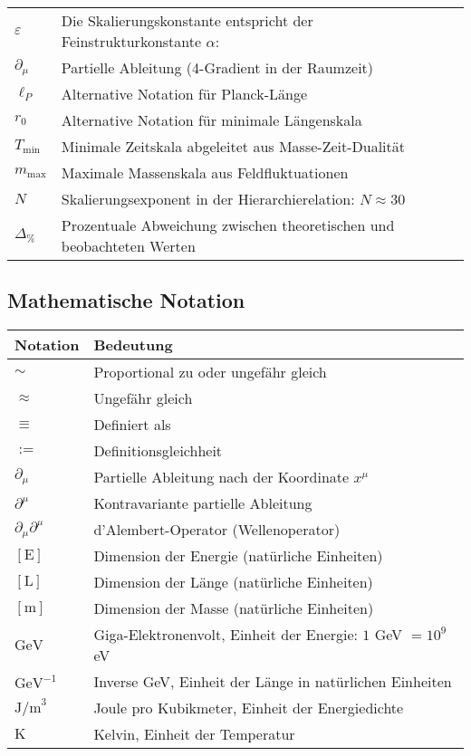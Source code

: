\documentclass[12pt,a4paper]{article}
\numberwithin{equation}{section}
\begin{document}
\begin{longtable}{p{2cm} p{12cm}}
		$\varepsilon$ & Die Skalierungskonstante entspricht der Feinstrukturkonstante $\alpha$: \\
		$\partial_\mu$ & Partielle Ableitung (4-Gradient in der Raumzeit) \\
		$\ell_P$ & Alternative Notation für Planck-Länge \\
		$r_0$ & Alternative Notation für minimale Längenskala \\
		$T_{\text{min}}$ & Minimale Zeitskala abgeleitet aus Masse-Zeit-Dualität \\
		$m_{\text{max}}$ & Maximale Massenskala aus Feldfluktuationen \\
		$N$ & Skalierungsexponent in der Hierarchierelation: $N \approx 30$ \\
		$\Delta_{\%}$ & Prozentuale Abweichung zwischen theoretischen und beobachteten Werten \\
		\bottomrule
	\end{longtable}
	
	\subsection*{Mathematische Notation}
	
	\begin{longtable}{p{2cm} p{12cm}}
		\toprule
		\textbf{Notation} & \textbf{Bedeutung} \\
		\midrule
		\endhead
		
		$\sim$ & Proportional zu oder ungefähr gleich \\
		$\approx$ & Ungefähr gleich \\
		$\equiv$ & Definiert als \\
		$:=$ & Definitionsgleichheit \\
		$\partial_\mu$ & Partielle Ableitung nach der Koordinate $x^\mu$ \\
		$\partial^\mu$ & Kontravariante partielle Ableitung \\
		$\partial_\mu \partial^\mu$ & d'Alembert-Operator (Wellenoperator) \\
		$[\text{E}]$ & Dimension der Energie (natürliche Einheiten) \\
		$[\text{L}]$ & Dimension der Länge (natürliche Einheiten) \\
		$[\text{m}]$ & Dimension der Masse (natürliche Einheiten) \\
		$\text{GeV}$ & Giga-Elektronenvolt, Einheit der Energie: $1$ GeV $= 10^9$ eV \\
		$\text{GeV}^{-1}$ & Inverse GeV, Einheit der Länge in natürlichen Einheiten \\
		$\text{J/m}^3$ & Joule pro Kubikmeter, Einheit der Energiedichte \\
		$\text{K}$ & Kelvin, Einheit der Temperatur \\
		\bottomrule
	\end{longtable}
	
\end{document}
